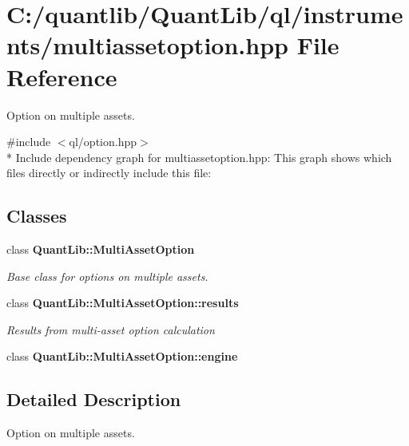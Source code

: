 \section{C\+:/quantlib/\+Quant\+Lib/ql/instruments/multiassetoption.hpp File Reference}
\label{multiassetoption_8hpp}


Option on multiple assets.  


{\ttfamily \#include $<$ql/option.\+hpp$>$}\\*
Include dependency graph for multiassetoption.\+hpp\+:
This graph shows which files directly or indirectly include this file\+:
\subsection*{Classes}
\begin{DoxyCompactItemize}
\item 
class {\bf Quant\+Lib\+::\+Multi\+Asset\+Option}
\begin{DoxyCompactList}\small\item\em Base class for options on multiple assets. \end{DoxyCompactList}\item 
class {\bf Quant\+Lib\+::\+Multi\+Asset\+Option\+::results}
\begin{DoxyCompactList}\small\item\em Results from multi-\/asset option calculation \end{DoxyCompactList}\item 
class {\bf Quant\+Lib\+::\+Multi\+Asset\+Option\+::engine}
\end{DoxyCompactItemize}


\subsection{Detailed Description}
Option on multiple assets. 

